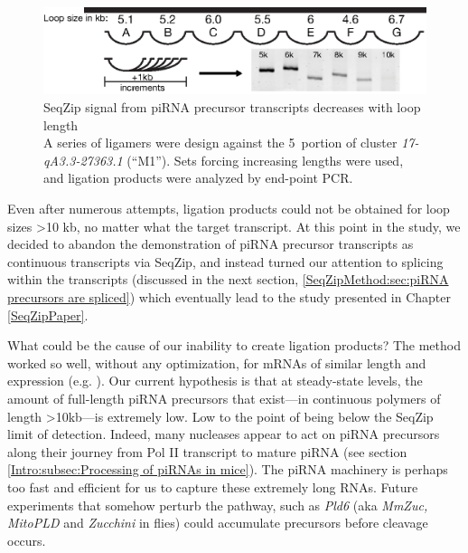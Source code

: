     \begin{figure} %
      \centering
      \includegraphics{Figures/SeqZipMethod/piRNAprecusorM1SignalDecreasesWithLoopLength.eps}
      \caption[SeqZip signal from piRNA precursor transcripts decreases with loop length]
      {
        SeqZip signal from piRNA precursor transcripts decreases with loop length\\[0.25cm]
        A series of ligamers were design against the 5\textprime~portion of cluster \textit{17-qA3.3-27363.1} (``M1''). Sets forcing increasing lengths were used, and ligation products were analyzed by end-point PCR.
        }
      \label{SeqZipMethod:fig:piRNA precusors and loop length}
      \end{figure}

    Even after numerous attempts, ligation products could not be obtained for loop sizes >10 kb, no matter what the target transcript. At this point in the study, we decided to abandon the demonstration of piRNA precursor transcripts as continuous transcripts via SeqZip, and instead turned our attention to splicing within the transcripts (discussed in the next section, \ref{SeqZipMethod:sec:piRNA precursors are spliced}) which eventually lead to the study presented in Chapter \ref{SeqZipPaper}.

    What could be the cause of our inability to create ligation products? The method worked so well, without any optimization, for mRNAs of similar length and expression (e.g. \dst{}). Our current hypothesis is that at steady-state levels, the amount of full-length piRNA precursors that exist---in continuous polymers of length >10kb---is extremely low. Low to the point of being below the SeqZip limit of detection. Indeed, many nucleases appear to act on piRNA precursors along their journey from Pol II transcript to mature piRNA (see section \ref{Intro:subsec:Processing of piRNAs in mice}). The piRNA machinery is perhaps too fast and efficient for us to capture these extremely long RNAs. Future experiments that somehow perturb the pathway, such as \textit{Pld6} (aka \textit{MmZuc, MitoPLD} and \textit{Zucchini} in flies) could accumulate precursors before cleavage occurs.

